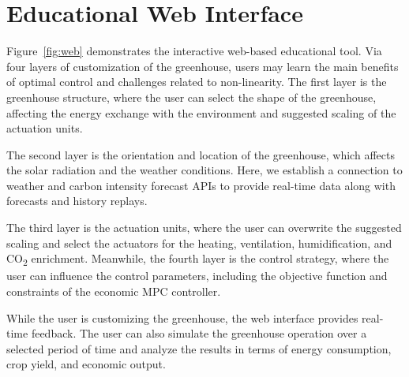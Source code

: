 \documentclass[conference]{IEEEtran}
\begin{document}
\section{Educational Web Interface}
Figure~\ref{fig:web} demonstrates the interactive web-based educational tool. Via four layers of customization of the greenhouse, users may learn the main benefits of optimal control and challenges related to non-linearity. The first layer is the greenhouse structure, where the user can select the shape of the greenhouse, affecting the energy exchange with the environment and suggested scaling of the actuation units.

The second layer is the orientation and location of the greenhouse, which affects the solar radiation and the weather conditions. Here, we establish a connection to weather and carbon intensity forecast APIs to provide real-time data along with forecasts and history replays.

The third layer is the actuation units, where the user can overwrite the suggested scaling and select the actuators for the heating, ventilation, humidification, and CO\textsubscript{2} enrichment. Meanwhile, the fourth layer is the control strategy, where the user can influence the control parameters, including the objective function and constraints of the economic MPC controller.

While the user is customizing the greenhouse, the web interface provides real-time feedback. The user can also simulate the greenhouse operation over a selected period of time and analyze the results in terms of energy consumption, crop yield, and economic output.
\end{document}
